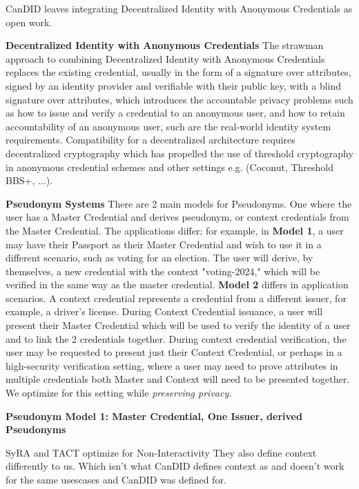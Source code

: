 CanDID leaves integrating Decentralized Identity with Anonymous Credentials as open work.

\noindent \textbf{Decentralized Identity with Anonymous Credentials}
The strawman approach to combining Decentralized Identity with Anonymous Credentials replaces the existing credential, usually in the form of a signature over attributes, signed by an identity provider and verifiable with their public key, with a blind signature over attributes, which introduces the accountable privacy problems such as how to issue and verify a credential to an anonymous user, and how to retain accountability of an anonymous user, such are the real-world identity system requirements. 
Compatibility for a decentralized architecture requires decentralized cryptography which has propelled the use of threshold cryptography in anonymous credential schemes and other settings e.g. (Coconut, Threshold BBS+, ...). 


\noindent \textbf{Pseudonym Systems}
There are 2 main models for Pseudonyms. One where the user has a Master Credential and derives pseudonym, or context credentials from the Master Credential. The applications differ; for example, in \textbf{Model 1}, a user may have their Passport as their Master Credential and wish to use it in a different scenario, such as voting for an election. The user will derive, by themselves, a new credential with the context "voting-2024," which will be verified in the same way as the master credential.
\textbf{Model 2} differs in application scenarios. A context credential represents a credential from a different issuer, for example, a driver's license. During Context Credential issuance, a user will present their Master Credential which will be used to verify the identity of a user and to link the 2 credentials together. During context credential verification, the user may be requested to present just their Context Credential, or perhaps in a high-security verification setting, where a user may need to prove attributes in multiple credentials both Master and Context will need to be presented together. We optimize for this setting while \emph{preserving privacy.}



\noindent \textbf{Pseudonym Model 1: Master Credential, One Issuer, derived Pseudonyms}

SyRA and TACT optimize for Non-Interactivity
They also define context differently to us. Which isn't what CanDID defines context as and doesn't work for the same usescases and CanDID was defined for. 

